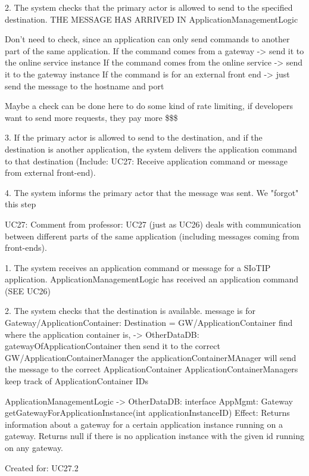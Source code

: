             2. The system checks that the primary actor is allowed to send to the specified destination.
                    THE MESSAGE HAS ARRIVED IN ApplicationManagementLogic

                    Don't need to check, since an application can only send commands to another part of the same application.
                    If the command comes from a gateway -> send it to the online service instance
                    If the command comes from the online service -> send it to the gateway instance
                    If the command is for an external front end -> just send the message to the hostname and port

                    Maybe a check can be done here to do some kind of rate limiting, if developers want to send
                    more requests, they pay more \$\$\$

            3. If the primary actor is allowed to send to the destination, and if the destination is another application,
               the system delivers the application command to that destination
                    (Include: UC27: Receive application command or message from external front-end).

            4. The system informs the primary actor that the message was sent.
                    We "forgot" this step

        UC27:
            Comment from professor:
               UC27 (just as UC26) deals with communication between different parts of the same application (including messages coming from front-ends).

            1. The system receives an application command or message for a SIoTIP application.
                ApplicationManagementLogic has received an application command (SEE UC26)

            2. The system checks that the destination is available.
                message is for Gateway/ApplicationContainer:
                    Destination = GW/ApplicationContainer
                    find where the application container is, -> OtherDataDB: gatewayOfApplicationContainer
                    then send it to the correct GW/ApplicationContainerManager
                    the applicationContainerMAnager will send the message to the correct ApplicationContainer
                    ApplicationContainerManagers keep track of ApplicationContainer IDs

                    ApplicationManagementLogic -> OtherDataDB: interface AppMgmt: Gateway getGatewayForApplicationInstance(int applicationInstanceID)
                        Effect: Returns information about a gateway for a certain application instance running on a gateway. Returns null if there is no application instance with the given id running on any gateway.
                        \item Created for: UC27.2

